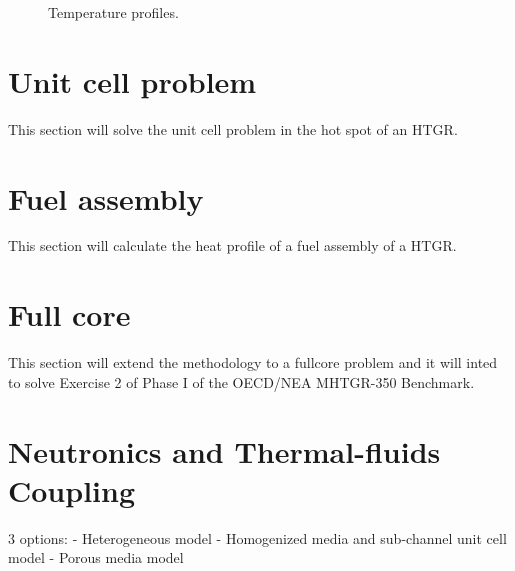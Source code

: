 \begin{figure}[htbp!]
	\centering
	\hfill
    \caption{Temperature profiles.}
	\label{fig:th-ver-results}
\end{figure}

\section{Unit cell problem}

This section will solve the unit cell problem in the hot spot of an HTGR.

\section{Fuel assembly}

This section will calculate the heat profile of a fuel assembly of a HTGR.

\section{Full core}

This section will extend the methodology to a fullcore problem and it will inted to solve Exercise 2 of Phase I of the OECD/NEA MHTGR-350 Benchmark.




\section{Neutronics and Thermal-fluids Coupling}

3 options:
- Heterogeneous model
- Homogenized media and sub-channel unit cell model
- Porous media model

